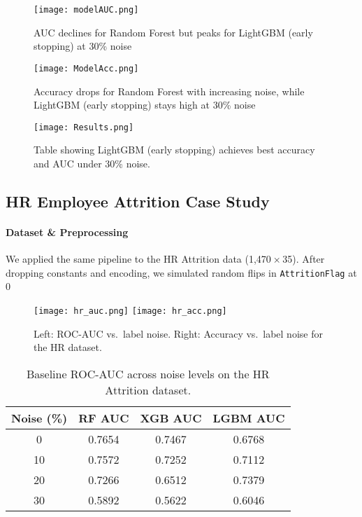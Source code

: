 \documentclass[conference]{IEEEtran}
\begin{document}
\begin{figure}[H]
    \centering
    \texttt{[image: modelAUC.png]}
    \caption{AUC declines for Random Forest but peaks for LightGBM (early stopping) at 30\% noise}
    \label{fig:lightgbm-30noise}
\end{figure}

\begin{figure}[H]
    \centering
    \texttt{[image: ModelAcc.png]}
    \caption{Accuracy drops for Random Forest with increasing noise, while LightGBM (early stopping) stays high at 30\% noise}
    \label{fig:lightgbm-30noise}
\end{figure}

\begin{figure}[H]
    \centering
    \texttt{[image: Results.png]}
    \caption{Table showing LightGBM (early stopping) achieves best accuracy and AUC under 30\% noise.}
    \label{fig:lightgbm-30noise}
\end{figure}

\subsection{HR Employee Attrition Case Study}

\paragraph{Dataset \& Preprocessing}
We applied the same pipeline to the HR Attrition data (1,470 × 35).  After dropping constants and encoding, we simulated random flips in {\tt AttritionFlag} at 0 %

\begin{figure}[H]
  \centering
  \texttt{[image: hr\_auc.png]}
  \texttt{[image: hr\_acc.png]}
  \caption{Left: ROC-AUC vs.\ label noise.  Right: Accuracy vs.\ label noise for the HR dataset.}
  \label{fig:hr-baseline}
\end{figure}

\begin{table}[H]
  \centering
  \small
  \begin{tabular}{c|ccc}
    \hline
    Noise (\%) & RF AUC & XGB AUC & LGBM AUC \\ 
    \hline
      0 & 0.7654 & 0.7467 & 0.6768 \\
     10 & 0.7572 & 0.7252 & 0.7112 \\
     20 & 0.7266 & 0.6512 & 0.7379 \\
     30 & 0.5892 & 0.5622 & 0.6046 \\
    \hline
  \end{tabular}
  \caption{Baseline ROC-AUC across noise levels on the HR Attrition dataset.}
  \label{tab:hr-baseline}
\end{table}
\end{document}

